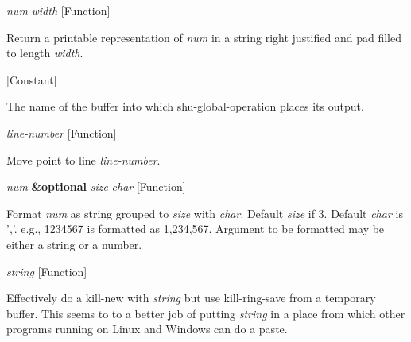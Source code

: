 \vspace{1em}
\noindent
{}
\usebox{\funcname}\emph{num} \emph{width}
 \hfill [Function]

\begin{doc-string}
Return a printable representation of \emph{num} in a string right justified
and pad filled to length \emph{width}.
\end{doc-string}

\vspace{1em}
\noindent
{}
\usebox{\funcname}
 \hfill [Constant]

\begin{doc-string}
The name of the buffer into which shu-global-operation places its output.
\end{doc-string}

\vspace{1em}
\noindent
{}
\usebox{\funcname}\emph{line-number}
 \hfill [Function]

\begin{doc-string}
Move point to line \emph{line-number}.
\end{doc-string}

\vspace{1em}
\noindent
{}
\usebox{\funcname}\emph{num} \textbf{\&optional} \emph{size} \emph{char}
 \hfill [Function]

\begin{doc-string}
Format \emph{num} as string grouped to \emph{size} with \emph{char}.  Default \emph{size} if 3.  Default \emph{char}
is ','.  e.g., 1234567 is formatted as 1,234,567.  Argument to be formatted may be
either a string or a number.
\end{doc-string}

\vspace{1em}
\noindent
{}
\usebox{\funcname}\emph{string}
 \hfill [Function]

\begin{doc-string}
Effectively do a kill-new with \emph{string} but use kill-ring-save from
a temporary buffer.  This seems to to a better job of putting \emph{string}
in a place from which other programs running on Linux and Windows can
do a paste.
\end{doc-string}

